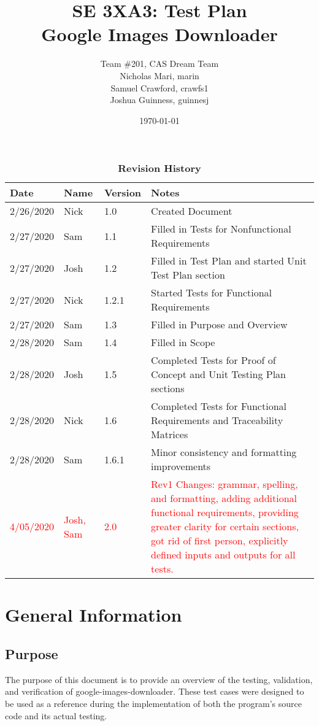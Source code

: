 \documentclass[12pt, titlepage]{article}
\title{SE 3XA3: Test Plan\\Google Images Downloader}
\author{Team \#201, CAS Dream Team
		\\ Nicholas Mari, marin
		\\ Samuel Crawford, crawfs1
		\\ Joshua Guinness, guinnesj
}
\date{\today}
\begin{document}
\maketitle

\tableofcontents
\listoftables

\begin{table}[!b]
\begin{tabularx}{\textwidth}{lllp{7.5cm}}
\toprule {\bf Date} & {\bf Name} & {\bf Version} & {\bf Notes}\\
\midrule
2/26/2020 & Nick & 1.0 & Created Document\\
2/27/2020 & Sam & 1.1 & Filled in Tests for Nonfunctional Requirements\\
2/27/2020 & Josh & 1.2 & Filled in Test Plan and started Unit Test Plan section\\
2/27/2020 & Nick & 1.2.1 & Started Tests for Functional Requirements\\
2/27/2020 & Sam & 1.3 & Filled in Purpose and Overview\\
2/28/2020 & Sam & 1.4 & Filled in Scope\\
2/28/2020 & Josh & 1.5 & Completed Tests for Proof of Concept and Unit Testing Plan sections\\
2/28/2020 & Nick & 1.6 & Completed Tests for Functional Requirements and Traceability Matrices\\
2/28/2020 & Sam & 1.6.1 & Minor consistency and formatting improvements\\
\textcolor{red}{4/05/2020} & \textcolor{red}{Josh, Sam} & \textcolor{red}{2.0} & \textcolor{red}{Rev1 Changes: 
grammar, spelling, and formatting, adding additional functional requirements, providing greater clarity for certain sections, 
got rid of first person, explicitly defined inputs and outputs for all tests.}\\
\bottomrule
\end{tabularx}
\caption{\bf Revision History}
\end{table}

\newpage


\section{General Information}

\subsection{Purpose}
The purpose of this document is to provide an overview of the testing, validation, and verification of google-images-downloader. These test cases were designed to be used as a reference during the implementation of both the program's source code and its actual testing.
\end{document}
